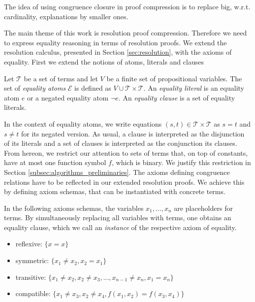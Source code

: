 The idea of using congruence closure in proof compression is to replace big, w.r.t. cardinality, explanations by smaller ones.

The main theme of this work is resolution proof compression.
Therefore we need to express equality reasoning in terms of resolution proofs.
We extend the resolution calculus, presented in Section \ref{sec:resolution}, with the axioms of equality.
First we extend the notions of atoms, literals and clauses

\begin{definition}

Let $\mathcal{T}$ be a set of terms and let $V$ be a finite set of propositional variables.
The set of \emph{equality atoms} $\mathcal{E}$ is defined as $V \cup \mathcal{T} \times \mathcal{T}$.
An \emph{equality literal} is an equality atom $e$ or a negated equality atom $\neg e$.
An \emph{equality clause} is a set of equality literals.

\end{definition}

In the context of equality atoms, we write equations $(s,t) \in \mathcal{T} \times \mathcal{T}$ as $s = t$ and $s \neq t$ for its negated version.
As usual, a clause is interpreted as the disjunction of its literals and a set of clauses is interpreted as the conjunction its clauses.\\

From hereon, we restrict our attention to sets of terms that, on top of constants, have at most one function symbol $f$, which is binary.
We justify this restriction in Section \ref{subsec:algorithms_preliminaries}.
The axioms defining congruence relations have to be reflected in our extended resolution proofs.
We achieve this by defining axiom schemas, that can be instantiated with concrete terms.

\begin{definition}

In the following axioms schemas, the variables $x_1,\ldots,x_n$ are placeholders for terms.
By simultaneously replacing all variables with terms, one obtains an equality clause, which we call an \emph{instance} of the respective axiom of equality.

\begin{itemize}
	\item reflexive: $\{x = x\}$
	\item symmetric: $\{x_1 \neq x_2, x_2 = x_1\}$
	\item transitive: $\{x_1 \neq x_2, x_2 \neq x_3, \ldots, x_{n-1} \neq x_n, x_1 = x_n\}$
	\item compatible: $\{x_1 \neq x_3, x_2 \neq x_4, f(x_1,x_2) = f(x_3,x_4)\}$
\end{itemize}

\end{definition}

